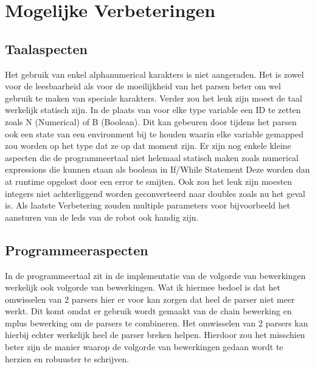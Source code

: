 \documentclass[a4paper,10pt]{article}
\begin{document}
\section{Mogelijke Verbeteringen}
  \subsection{Taalaspecten} 
  Het gebruik van enkel alphanumerical karakters is niet aangeraden.
  Het is zowel voor de leesbaarheid als voor de moeilijkheid van het parsen beter om wel gebruik te maken van speciale karakters.
  Verder zou het leuk zijn moest de taal werkelijk statisch zijn. In de plaats van voor elke type variable een ID te zetten zoals N (Numerical) of B (Boolean).
  Dit kan gebeuren door tijdens het parsen ook een state van een environment bij te houden waarin elke variable gemapped zou worden op het type dat ze op dat moment zijn.
  Er zijn nog enkele kleine aspecten die de programmeertaal niet helemaal statisch maken zoals numerical expressions die kunnen staan als boolean in If/While Statement Deze worden dan at runtime opgelost door een error te smijten.
  Ook zou het leuk zijn moesten integers niet achterliggend worden geconverteerd naar doubles zoals nu het geval is.
  Als laatste Verbetering zouden multiple parameters voor bijvoorbeeld het aansturen van de leds van de robot ook handig zijn.

  \subsection{Programmeeraspecten} 
  In de programmeertaal zit in de implementatie van de volgorde van bewerkingen werkelijk ook volgorde van bewerkingen.
  Wat ik hiermee bedoel is dat het omwisselen van 2 parsers hier er voor kan zorgen dat heel de parser niet meer werkt.
  Dit komt omdat er gebruik wordt gemaakt van de chain bewerking en mplus bewerking om de parsers te combineren. Het omwisselen van 2  parsers kan hierbij echter werkelijk heel de parser breken helpen. Hierdoor zou het misschien beter zijn de manier waarop de  volgorde van bewerkingen gedaan wordt te herzien en robuuster te schrijven.
\end{document}
